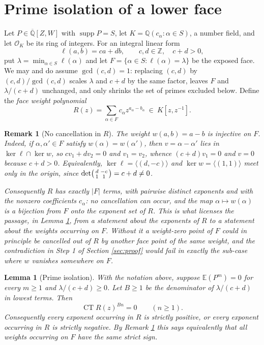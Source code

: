 \documentclass[10pt,a4paper]{amsart}
\newtheorem{lemma}[theorem]{Lemma}
\newtheorem{remark}[theorem]{Remark}
\numberwithin{equation}{section}
\DeclareMathOperator{\CT}{CT}
\DeclareMathOperator{\supp}{supp}
\newcommand{\Q}{\mathbb{Q}}
\newcommand{\Z}{\mathbb{Z}}
\newcommand{\E}{\mathbb{E}}
\newcommand{\Qbar}{\overline{\Q}}
\begin{document}
\section{Prime isolation of a lower face}\label{sec:isolation}

Let $P\in\Qbar[Z,W]$ with $\supp P=S$, let $K=\Q(c_\alpha:\alpha\in S)$, a
number field, and let $\mathcal O_K$ be its ring of integers. For an integral
linear form
\[
  \ell(a,b)=ca+db, \qquad c,d\in\Z,\quad c+d>0,
\]
put $\lambda=\min_{\alpha\in S}\ell(\alpha)$ and let
$F=\{\alpha\in S:\ell(\alpha)=\lambda\}$ be the exposed face. We may and do
assume $\gcd(c,d)=1$: replacing $(c,d)$ by $(c,d)/\gcd(c,d)$ scales $\lambda$
and $c+d$ by the same factor, leaves $F$ and $\lambda/(c+d)$ unchanged, and only
shrinks the set of primes excluded below. Define the \emph{face weight
polynomial}
\[
  R(z)=\sum_{\alpha\in F}c_\alpha z^{a_\alpha-b_\alpha}
  \ \in\ K[z,z^{-1}].
\]

\begin{remark}[No cancellation in $R$]\label{rem:injective}
The weight $w(a,b)=a-b$ is injective on $F$. Indeed, if $\alpha,\alpha'\in F$
satisfy $w(\alpha)=w(\alpha')$, then $v=\alpha-\alpha'$ lies in
$\ker\ell\cap\ker w$, so $cv_1+dv_2=0$ and $v_1=v_2$, whence $(c+d)v_1=0$ and
$v=0$ because $c+d>0$. Equivalently, $\ker\ell=\langle(d,-c)\rangle$ and
$\ker w=\langle(1,1)\rangle$ meet only in the origin, since
$\det\begin{psmallmatrix}d&-c\\1&1\end{psmallmatrix}=c+d\ne0$.

Consequently $R$ has exactly $|F|$ terms, with pairwise distinct exponents and
with the nonzero coefficients $c_\alpha$: no cancellation can occur, and the
map $\alpha\mapsto w(\alpha)$ is a bijection from $F$ onto the exponent set of
$R$. This is what licenses the passage, in Lemma \ref{lem:isolation}, from a
statement about the exponents of $R$ to a statement about the weights occurring
on $F$. Without it a weight-zero point of $F$ could in principle be cancelled
out of $R$ by another face point of the same weight, and the contradiction in
Step 1 of Section \ref{sec:proof} would fail in exactly the sub-case where $w$
vanishes somewhere on $F$.
\end{remark}


\begin{lemma}[Prime isolation]\label{lem:isolation}
With the notation above, suppose $\E(P^m)=0$ for every $m\ge1$ and
$\lambda/(c+d)\ge0$. Let $B\ge1$ be the denominator of $\lambda/(c+d)$ in lowest
terms. Then
\begin{equation}\label{eq:CTvanish}
  \CT R(z)^{Bn}=0 \qquad (n\ge1).
\end{equation}
Consequently every exponent occurring in $R$ is strictly positive, or every
exponent occurring in $R$ is strictly negative. By Remark \ref{rem:injective}
this says equivalently that all weights occurring on $F$ have the same strict
sign.
\end{lemma}
\end{document}
